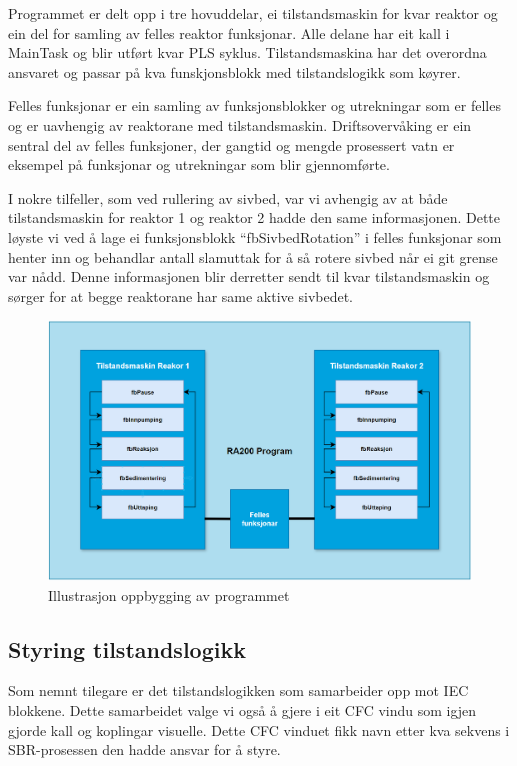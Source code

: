 Programmet er delt opp i tre hovuddelar, ei tilstandsmaskin for kvar reaktor og ein del for samling av felles reaktor funksjonar.
Alle delane har eit kall i MainTask og blir utført kvar \gls{PLS} syklus. Tilstandsmaskina har det overordna ansvaret og passar på kva 
funskjonsblokk med tilstandslogikk som køyrer.

Felles funksjonar er ein samling av funksjonsblokker og utrekningar som er felles og er uavhengig av reaktorane med tilstandsmaskin.
Driftsovervåking er ein sentral del av felles funksjoner, der gangtid og mengde prosessert vatn er eksempel på funksjonar og utrekningar
som blir gjennomførte.

I nokre tilfeller, som ved rullering av sivbed, var vi avhengig av at både tilstandsmaskin for reaktor 1 og reaktor 2 hadde den same informasjonen.
Dette løyste vi ved å lage ei funksjonsblokk ``fbSivbedRotation'' i felles funksjonar som henter inn og behandlar antall slamuttak for å så rotere sivbed når ei git grense var nådd.
Denne informasjonen blir derretter sendt til kvar tilstandsmaskin og sørger for at begge reaktorane har same aktive sivbedet.


\begin{figure}[htbp]
    \centering
    \includegraphics[width=1\textwidth]{Figurar/Oppbygging_Program.png}
    \caption{Illustrasjon oppbygging av programmet}\label{fig:OppbyggingProgram}
\end{figure}


\newpage

\subsection{Styring tilstandslogikk}

Som nemnt tilegare er det tilstandslogikken som samarbeider opp mot \gls{IEC} blokkene. Dette samarbeidet valge vi også å gjere i eit
\gls{CFC} vindu som igjen gjorde kall og koplingar visuelle. Dette \gls{CFC} vinduet fikk navn etter kva sekvens i SBR-prosessen
den hadde ansvar for å styre. 

